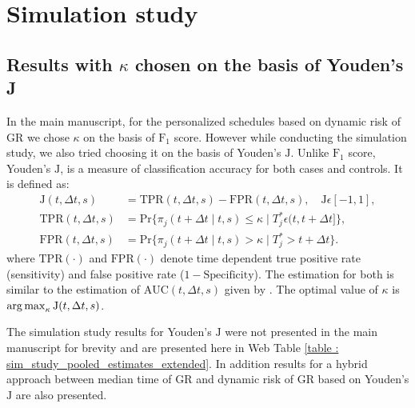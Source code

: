 \section{Simulation study}

\subsection{Results with $\kappa$ chosen on the basis of Youden's J}
In the main manuscript, for the personalized schedules based on dynamic risk of GR we chose $\kappa$ on the basis of $\mbox{F}_1$ score. However while conducting the simulation study, we also tried choosing it on the basis of Youden's $\mbox{J}$. Unlike $\mbox{F}_1$ score, Youden's $\mbox{J}$, is a measure of classification accuracy for both cases and controls. It is defined as:
\begin{align*}
\mbox{J}(t, \Delta t, s) &= \text{TPR}(t, \Delta t, s) - \text{FPR}(t, \Delta t, s), \quad \mbox{J}\epsilon [-1,1],\\
\text{TPR}(t, \Delta t, s) &= \mbox{Pr}\big\{\pi_j(t + \Delta t \mid t,s) \leq \kappa \mid T^*_j \epsilon (t, t + \Delta t]\big\},\\
\text{FPR}(t, \Delta t, s) &= \mbox{Pr}\big\{\pi_j(t + \Delta t \mid t,s) > \kappa \mid T^*_j > t + \Delta t \big\}.
\end{align*}
where $\mbox{TPR}(\cdot)$ and $\mbox{FPR}(\cdot)$ denote time dependent true positive rate (sensitivity) and false positive rate ($1 - \mbox{Specificity}$). The estimation for both is similar to the estimation of $\mbox{AUC}(t, \Delta t, s)$ given by \citet{landmarking2017}. The optimal value of $\kappa$ is $\operatorname{arg\,max}_{\kappa} \mbox{J}(t, \Delta t, s)$.

The simulation study results for Youden's $\mbox{J}$ were not presented in the main manuscript for brevity and are presented here in Web Table \ref{table : sim_study_pooled_estimates_extended}. In addition results for a hybrid approach between median time of GR and dynamic risk of GR based on Youden's $\mbox{J}$ are also presented.

